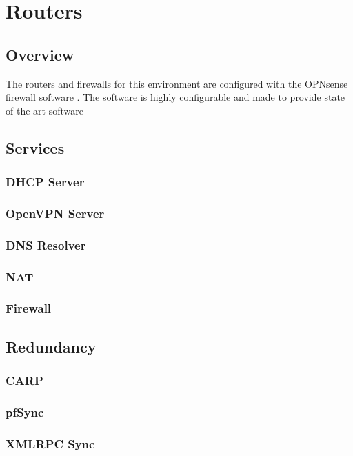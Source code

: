 \documentclass[12pt]{IEEEtran}
\begin{document}
\section{Routers}

\subsection{Overview}
The routers and firewalls for this environment are configured with the OPNsense firewall software \cite{opnsense}. The software is highly configurable and made to provide state of the art software 

\subsection{Services}
\blindtext
\subsubsection{DHCP Server}
\blindtext
\subsubsection{OpenVPN Server}
\blindtext
\subsubsection{DNS Resolver}
\blindtext
\subsubsection{NAT}
\blindtext
\subsubsection{Firewall}
\blindtext

\subsection{Redundancy}
\subsubsection{CARP}
\blindtext
\subsubsection{pfSync}
\blindtext
\subsubsection{XMLRPC Sync}
\blindtext
\end{document}
